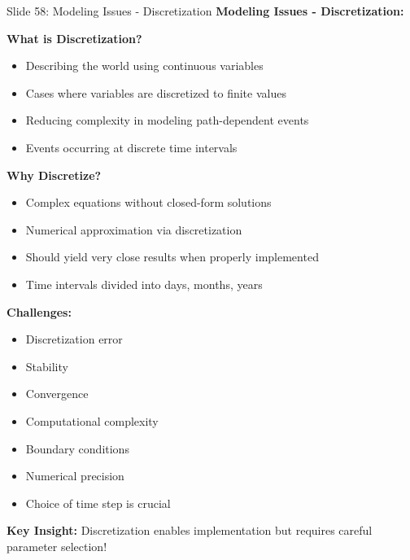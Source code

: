 \documentclass[8pt]{beamer}
\begin{document}
	\begin{frame}{Slide 58: Modeling Issues - Discretization}
		\fontsize{6.5}{7.5}\selectfont
		\textbf{Modeling Issues - Discretization:}
		
		\vspace{0.1cm}
		\textbf{What is Discretization?}
		\begin{itemize}
			\item Describing the world using continuous variables
			\item Cases where variables are discretized to finite values
			\item Reducing complexity in modeling path-dependent events
			\item Events occurring at discrete time intervals
		\end{itemize}
		
		\vspace{0.1cm}
		\textbf{Why Discretize?}
		\begin{itemize}
			\item Complex equations without closed-form solutions
			\item Numerical approximation via discretization
			\item Should yield very close results when properly implemented
			\item Time intervals divided into days, months, years
		\end{itemize}
		
		\vspace{0.1cm}
		\textbf{Challenges:}
		\begin{itemize}
			\item Discretization error
			\item Stability
			\item Convergence
			\item Computational complexity
			\item Boundary conditions
			\item Numerical precision
			\item Choice of time step is crucial
		\end{itemize}
		
		\textcolor{myblue}{\textbf{Key Insight:}} Discretization enables implementation but \textcolor{myblue}{requires careful parameter selection}!
	\end{frame}
	
\end{document}
